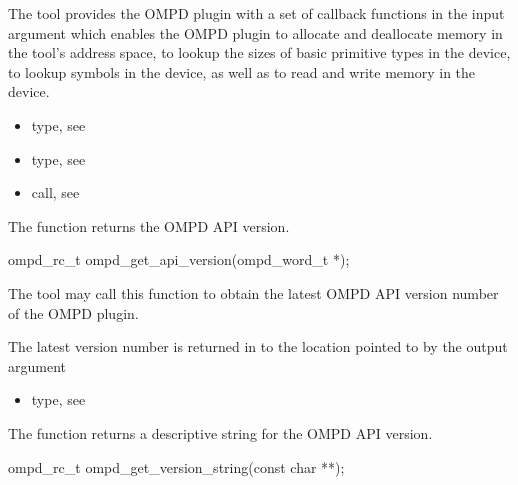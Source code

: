 The tool provides the OMPD plugin with a set of callback functions in the  input argument
which enables the OMPD plugin to allocate and deallocate memory in the tool's address space, to lookup the
sizes of basic primitive types in the device, to lookup symbols in the device, as well as to read and
write memory in the device.

\crossreferences
\begin{itemize}
  \item {} type, see 
	\item {} type, see 
	\item {} call, see 
\end{itemize}

\label{subsubsubsec:ompd_get_api_version}

\summary
The  function returns the OMPD API version.

\format

\begin{cspecific}
\begin{ompSyntax}
ompd_rc_t ompd_get_api_version(ompd_word_t *);
\end{ompSyntax}
\end{cspecific}

\descr
The tool may call this function to obtain the latest OMPD API version number of the OMPD plugin.

\argdesc
The latest version number is returned in to the location pointed to by the  output argument

\crossreferences
\begin{itemize}
	\item {} type, see 
\end{itemize}

\label{subsubsubsec:ompd_get_version_string}

\summary
The  function returns a descriptive string for the OMPD API version.

\format

\begin{cspecific}
\begin{ompSyntax}
ompd_rc_t ompd_get_version_string(const char **);
\end{ompSyntax}
\end{cspecific}


